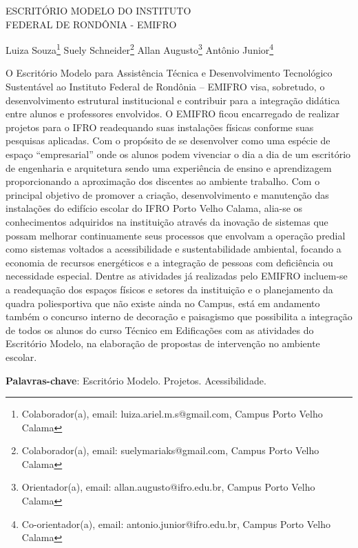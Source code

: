 \documentclass[article,12pt,onesidea,4paper,english,brazil]{abntex2}
\begin{document}
	
	
	\frenchspacing 
	
	\begin{center}
		\LARGE ESCRITÓRIO MODELO DO INSTITUTO \\FEDERAL DE RONDÔNIA - EMIFRO
		
		\normalsize
		Luiza Souza\footnote{Colaborador(a), email: luiza.ariel.m.s@gmail.com, Campus Porto Velho Calama} 
		Suely Schneider\footnote{Colaborador(a), email: suelymariaks@gmail.com, Campus Porto Velho Calama} 
		Allan Augusto\footnote{Orientador(a), email: allan.augusto@ifro.edu.br, Campus Porto Velho Calama} 
		Antônio Junior\footnote{Co-orientador(a), email: antonio.junior@ifro.edu.br, Campus Porto Velho Calama} 
	\end{center}
	
	\noindent O Escritório Modelo para Assistência Técnica e Desenvolvimento Tecnológico Sustentável ao Instituto Federal de Rondônia – EMIFRO visa, sobretudo, o desenvolvimento estrutural institucional e contribuir para a integração didática entre alunos e professores envolvidos. O EMIFRO ficou encarregado de realizar projetos para o IFRO readequando suas instalações físicas conforme suas pesquisas aplicadas. Com o propósito de se desenvolver como uma espécie de espaço “empresarial” onde os alunos podem vivenciar o dia a dia de um escritório de engenharia e arquitetura sendo uma experiência de ensino e aprendizagem proporcionando a aproximação dos discentes ao ambiente trabalho. Com o principal objetivo de promover a criação, desenvolvimento e manutenção das instalações do edifício escolar do IFRO Porto Velho Calama, alia-se os conhecimentos adquiridos na instituição através da inovação de sistemas que possam melhorar continuamente seus processos que envolvam a operação predial como sistemas voltados a acessibilidade e sustentabilidade ambiental, focando a economia de recursos energéticos e a integração de pessoas com deficiência ou necessidade especial. Dentre as atividades já realizadas pelo EMIFRO incluem-se a readequação dos espaços físicos e setores da instituição e o planejamento da quadra poliesportiva que não existe ainda no Campus, está em andamento também o concurso interno de decoração e paisagismo que possibilita a integração de todos os alunos do curso Técnico em Edificações com as atividades do Escritório Modelo, na elaboração de propostas de intervenção no ambiente escolar.
	
	\vspace{\onelineskip}
	
	\noindent
	\textbf{Palavras-chave}: Escritório Modelo. Projetos. Acessibilidade.
	
\end{document}
